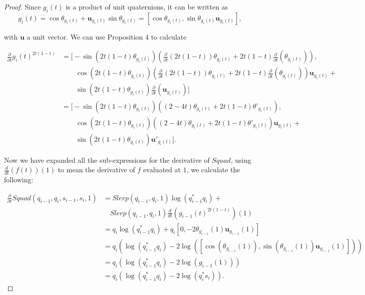 \documentclass[a4paper, 11pt]{article}
\begin{document}
\begin{proof}
    Since $g_i(t)$ is a product of unit quaternions, it can be written as 
    \[g_i(t) = \cos\theta_{g_i(t)} + \boldsymbol{u}_{g_i(t)} \sin \theta_{g_i(t)} = [\cos\theta_{g_i(t)},\sin \theta_{g_i(t)}\boldsymbol{u}_{g_i(t)} ], \]

    with $\boldsymbol{u}$ a unit vector. We can use Proposition 4 to calculate 

    \begin{align*}
    \frac{\partial}{\partial t} g_i(t)^{2t(1-t)} &= \Biggl[ -\sin(2t(1-t)\theta_{g_i(t)}) ( \frac{\partial}{\partial t}(2t(1-t))\theta_{g_i(t)} + 2t(1-t)\frac{\partial}{\partial t}(\theta_{g_i(t)}) ), \\
    &\qquad \cos(2t(1-t)\theta_{g_i(t)}) ( \frac{\partial}{\partial t}(2t(1-t))\theta_{g_i(t)} + 2t(1-t)\frac{\partial}{\partial t}(\theta_{g_i(t)}) ) \boldsymbol{u}_{g_i(t)} + \\
    &\qquad \sin(2t(1-t)\theta_{g_i(t)}) \frac{\partial}{\partial t}(\boldsymbol{u}_{g_i(t)}) \Biggr] \\
    &= \Biggl[ -\sin(2t(1-t)\theta_{g_i(t)}) ( (2-4t)\theta_{g_i(t)} + 2t(1-t)\theta'_{g_i(t)} ), \\
    &\qquad \cos(2t(1-t)\theta_{g_i(t)}) ( (2-4t)\theta_{g_i(t)} + 2t(1-t)\theta'_{g_i(t)} ) \boldsymbol{u}_{g_i(t)} + \\
    &\qquad \sin(2t(1-t)\theta_{g_i(t)}) \boldsymbol{u}'_{g_i(t)} \Biggr].
    \end{align*}

    Now we have expanded all the sub-expressions for the derivative of $Squad$, using $\frac{d}{dt}(f(t))(1)$ to mean the derivative of $f$ evaluated at $1$, we calculate the following:

    \begin{align*}
    \frac{\partial}{\partial t} Squad(q_{i-1}, q_i, s_{i-1}, s_i, 1) &= Slerp(q_{i-1}, q_i, 1) \log(q_{i-1}^* q_i) + \\
    &\quad Slerp(q_{i-1}, q_i, 1) \frac{d}{dt} \left( g_{i-1}(t)^{2t(1-t)} \right) (1) \\
    &= q_i \log(q_{i-1}^* q_i) + q_i [0, -2 \theta_{g_{i-1}}(1) \boldsymbol{u}_{g_{i-1}}(1)] \\
    &= q_i \left( \log(q_{i-1}^* q_i) - 2 \log([\cos(\theta_{g_{i-1}}(1)), \sin(\theta_{g_{i-1}}(1)) \boldsymbol{u}_{g_{i-1}}(1)]) \right) \\
    &= q_i ( \log(q_{i-1}^* q_i) - 2 \log(g_{i-1}(1)) ) \\
    &= q_i ( \log(q_{i-1}^* q_i) - 2 \log(q_i^* s_i) ).
    \end{align*}


\end{proof}
\end{document}
